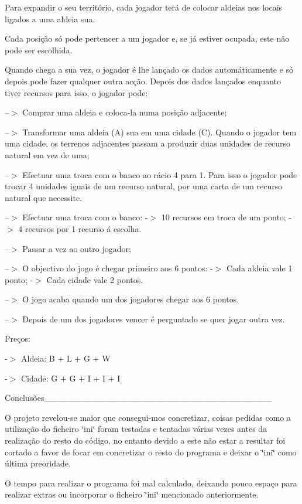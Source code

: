 Para expandir o seu território, cada jogador terá de colocar aldeias nos locais ligados a uma aldeia sua.

Cada posição só pode pertencer a um jogador e, se já estiver ocupada, este não pode ser escolhida.

Quando chega a sua vez, o jogador é lhe lançado os dados automáticamente e só depois pode fazer qualquer outra acção. Depois dos dados lançados enquanto tiver recursos para isso, o jogador pode\+:

--$>$ Comprar uma aldeia e coloca-\/la numa posição adjacente;

--$>$ Transformar uma aldeia (A) sua em uma cidade (C). Quando o jogador tem uma cidade, os terrenos adjacentes passam a produzir duas unidades de recurso natural em vez de uma;

--$>$ Efectuar uma troca com o banco ao rácio 4 para 1. Para isso o jogador pode trocar 4 unidades iguais de um recurso natural, por uma carta de um recurso natural que necessite.

--$>$ Efectuar uma troca com o banco\+: -\/$>$ 10 recursos em troca de um ponto; -\/$>$ 4 recursos por 1 recurso á escolha.

--$>$ Passar a vez ao outro jogador;

--$>$ O objectivo do jogo é chegar primeiro aos 6 pontos\+: -\/$>$ Cada aldeia vale 1 ponto; -\/$>$ Cada cidade vale 2 pontos.

--$>$ O jogo acaba quando um dos jogadores chegar aos 6 pontos.

--$>$ Depois de um dos jogadores vencer é perguntado se quer jogar outra vez.

Preços\+:

-\/$>$ Aldeia\+: B + L + G + W

-\/$>$ Cidade\+: G + G + I + I + I

Conclusões\+\_\+\+\_\+\+\_\+\+\_\+\+\_\+\+\_\+\+\_\+\+\_\+\+\_\+\+\_\+\+\_\+\+\_\+\+\_\+\+\_\+\+\_\+\+\_\+\+\_\+\+\_\+\+\_\+\+\_\+\+\_\+\+\_\+\+\_\+\+\_\+\+\_\+\+\_\+\+\_\+\+\_\+\+\_\+\+\_\+\+\_\+\+\_\+\+\_\+\+\_\+\+\_\+\+\_\+\+\_\+

O projeto revelou-\/se maior que consegui-\/mos concretizar, coisas pedidas como a utilização do ficheiro \char`\"{}ini\char`\"{} foram testadas e tentadas várias vezes antes da realização do resto do código, no entanto devido a este não estar a resultar foi cortado a favor de focar em concretizar o resto do programa e deixar o \char`\"{}ini\char`\"{} como última preoridade.

O tempo para realizar o programa foi mal calculado, deixando pouco espaço para realizar extras ou incorporar o ficheiro \char`\"{}ini\char`\"{} mencionado anteriormente.

